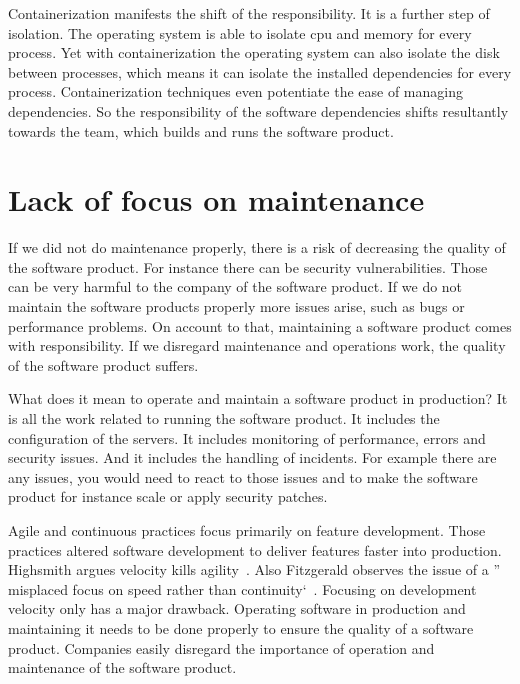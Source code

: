 Containerization manifests the shift of the responsibility. It is a further step of
isolation. The operating system is able to isolate cpu and memory for every process. Yet
with containerization the operating system can also isolate the disk between processes,
which means it can isolate the installed dependencies for every process. Containerization
techniques even potentiate the ease of managing dependencies. So the responsibility of the
software dependencies shifts resultantly towards the team, which builds and runs the
software product.


\section{Lack of focus on maintenance}

If we did not do maintenance properly, there is a risk of decreasing the quality of the
software product. For instance there can be security vulnerabilities. Those can be very
harmful to the company of the software product. If we do not maintain the software
products properly more issues arise, such as bugs or performance problems. On account to
that, maintaining a software product comes with responsibility. If we disregard
maintenance and operations work, the quality of the software product suffers.

What does it mean to operate and maintain a software product in production? It is all the
work related to running the software product. It includes the configuration of the
servers. It includes monitoring of performance, errors and security issues. And it
includes the handling of incidents. For example there are any issues, you would need to
react to those issues and to make the software product for instance scale or apply
security patches.

Agile and continuous practices focus primarily on feature development. Those practices
altered software development to deliver features faster into production. Highsmith argues
velocity kills agility~\cite{velocity_kills}. Also Fitzgerald observes the issue of a ''
misplaced focus on speed rather than continuity`~\cite{continuous_fitzgerald}. Focusing on
development velocity only has a major drawback. Operating software in production and
maintaining it needs to be done properly to ensure the quality of a software
product. Companies easily disregard the importance of operation and maintenance of the
software product.


